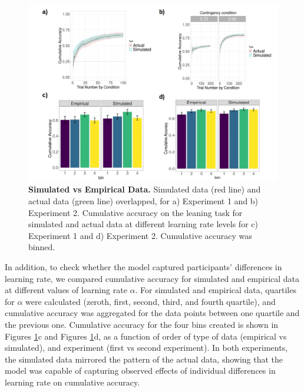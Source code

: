 \documentclass[a4paper,12pt]{article}
\begin{document}
\begin{figure}[ht!]
\centerline
{\includegraphics[width=1\textwidth]{figures/binplot_lr.jpg}}
\caption{\textbf{Simulated vs Empirical Data.} Simulated data (red line) and actual data (green line) overlapped, for a) Experiment 1  and b) Experiment 2. Cumulative accuracy on the leaning task for simulated and actual data  at different learning rate levels for c) Experiment 1 and d) Experiment 2.  Cumulative accuracy was binned. }
\label{fig:simvsemp}
\end{figure}



In addition, to check whether the model captured participants' differences in learning rate, we compared cumulative accuracy for simulated and empirical data at different values of learning rate $\alpha$. For simulated and empirical data, quartiles for $\alpha$ were calculated (zeroth, first, second, third, and fourth quartile), and cumulative accuracy was aggregated for the data points between one quartile and the previous one. Cumulative accuracy for the four bins created is shown in Figures \ref{fig:simvsemp}c and Figures \ref{fig:simvsemp}d, as a function of order of type of data (empirical vs simulated), and experiment (first vs second experiment). In both experiments, the simulated data mirrored the pattern of the actual data, showing that the model was capable of capturing observed effects of individual differences in learning rate on cumulative accuracy. 
\end{document}
